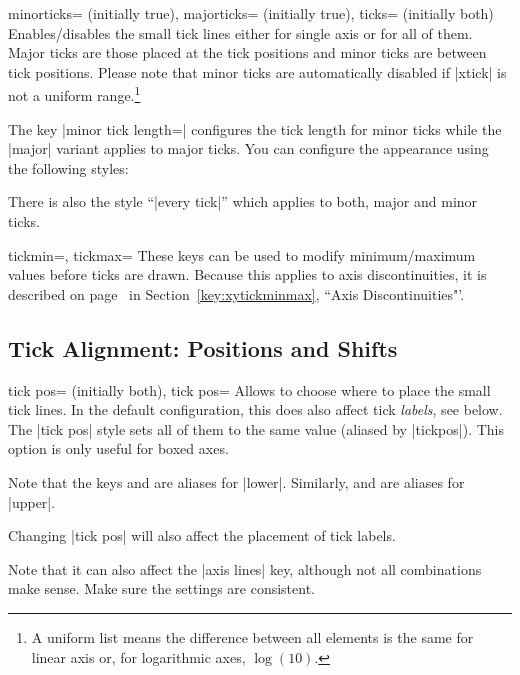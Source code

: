\begin{pgfplotsxykeylist}{%
    \x minorticks= (initially true),
    \x majorticks= (initially true),
    ticks= (initially both)%
}
    Enables/disables the small tick lines either for single axis or for all of
    them. Major ticks are those placed at the tick positions and minor ticks
    are between tick positions. Please note that minor ticks are automatically
    disabled if |xtick| is not a uniform range.\footnote{A uniform list means
    the difference between all elements is the same for linear axis or, for
    logarithmic axes, $\log(10)$.}

    The key |minor tick length=| configures the tick length for
    minor ticks while the |major| variant applies to major ticks. You can
    configure the appearance using the following styles:
\begin{codeexample}
\end{codeexample}
    There is also the style ``|every tick|'' which applies to both, major and
    minor ticks.
\end{pgfplotsxykeylist}

\begin{pgfplotsxykeylist}{\x tickmin=, \x tickmax=}
    These keys can be used to modify minimum/maximum values before ticks are
    drawn. Because this applies to axis discontinuities, it is described on
    page~\pageref{key:xytickminmax} in Section~\ref{key:xytickminmax}, ``Axis
    Discontinuities"'.
\end{pgfplotsxykeylist}


\subsection{Tick Alignment: Positions and Shifts}

\begin{pgfplotsxykeylist}{%
    \x tick pos= (initially both),
    tick pos=%
}
    Allows to choose where to place the small tick lines. In the default
    configuration, this does also affect tick \emph{labels}, see below. The
    |tick pos| style sets all of them to the same value (aliased by
    |tickpos|). This option is only useful
    for boxed axes.

    Note that the keys  and  are aliases
    for |lower|. Similarly,  and  are
    aliases for |upper|.

    Changing |tick pos| will also affect the placement of tick labels.

    Note that it can also affect the |axis lines| key, although not all
    combinations make sense. Make sure the settings are consistent.
\end{pgfplotsxykeylist}

